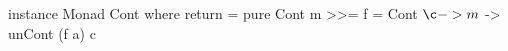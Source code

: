 \begin{code}
instance Monad Cont where
  return = pure
  Cont m >>= f = Cont $ \c ->
    m $ \a ->
      unCont (f a) c
\end{code}
